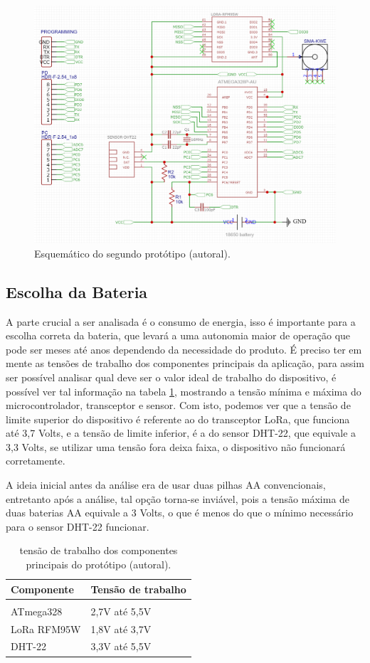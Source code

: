 \begin{figure}[H]
  \centering
  \includegraphics[width=.80\textwidth]{assets/end-node-proto-2-schematic.png} 
  \caption{Esquemático do segundo protótipo (autoral).}
  \label{fig:end-node-proto-2-schematic} 
\end{figure}

\subsection{Escolha da Bateria}
\label{metod:end-node:bateria}
A parte crucial a ser analisada é o consumo de energia, isso é importante para a escolha correta da bateria, que levará a uma autonomia maior de operação que pode ser meses até anos dependendo da necessidade do produto. É preciso ter em mente as tensões de trabalho dos componentes principais da aplicação, para assim ser possível analisar qual deve ser o valor ideal de trabalho do dispositivo, é possível ver tal informação na tabela \ref{tab:end-node-componentes-volts}, mostrando a tensão mínima e máxima do microcontrolador, transceptor e sensor. Com isto, podemos ver que a tensão de limite superior do dispositivo é referente ao do transceptor LoRa, que funciona até 3,7 Volts, e a tensão de limite inferior, é a do sensor DHT-22, que equivale a 3,3 Volts, se utilizar uma tensão fora deixa faixa, o dispositivo não funcionará corretamente. 

A ideia inicial antes da análise era de usar duas pilhas AA convencionais, entretanto após a análise, tal opção torna-se inviável, pois a tensão máxima de duas baterias AA equivale a 3 Volts, o que é menos do que o mínimo necessário para o sensor DHT-22 funcionar.

\begin{table}[H]
\centering 
\scalebox{1} {
	\begin{tabular}{l | l}
	\textbf{Componente}&\textbf{Tensão de trabalho}\\[5pt] \hline
  \\
	ATmega328&2,7V até 5,5V\\[5pt]
	LoRa RFM95W&1,8V até 3,7V\\[5pt]
	DHT-22&3,3V até 5,5V\\[5pt]
	\end{tabular}
}
\caption{tensão de trabalho dos componentes principais do protótipo (autoral).}
\label{tab:end-node-componentes-volts}
\end{table}

